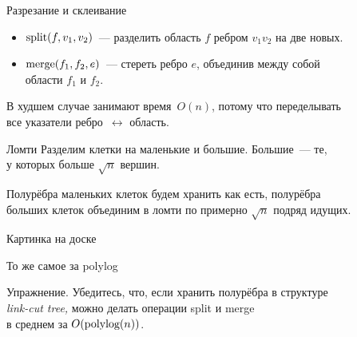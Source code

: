 \documentclass[12pt,aspectratio=169,svgnames]{beamer}
\begin{document}
\begin{frame}{Разрезание и склеивание}
\begin{itemize}
	\item \(\operatorname{split} (f,v_1,v_2)\)~— разделить область \(f\) ребром \(v_1v_2\) на две новых.
	\item \(\operatorname{merge} (f_1,f_2,e)\)~— стереть ребро \(e\), объединив между собой \\
	   области \(f_1\) и \(f_2\).
\end{itemize}
\begin{center}  \end{center} \vspace{-3mm}

	В худшем случае занимают время~\(O(n)\), потому что переделывать \\
	все указатели ребро~\(\leftrightarrow\) область.
\end{frame}

\begin{frame}{Ломти}
	Разделим клетки на \alert{маленькие} и \alert{большие}. Большие~— те,\\
	у которых больше \(\sqrt{n}\) вершин.

	Полурёбра маленьких клеток будем хранить как есть, полурёбра\\
	больших клеток объединим в \alert{ломти} по примерно \(\sqrt{n}\) подряд идущих. \bigskip

	{\footnotesize \textcolor{white!46!dgray}{Картинка на доске}}
\end{frame}

\begin{frame}{То же самое за polylog}
\begin{block}{Упражнение.}
	Убедитесь, что, если хранить полурёбра в структуре\\
	{\it link-cut tree,} можно делать операции split и merge\\
	в среднем за \(O\lr*{\text{polylog}\lr*{n}}\).
\end{block}
\end{frame}
\end{document}
